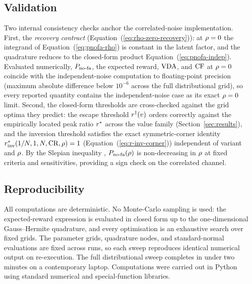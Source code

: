 \subsection{Validation}
\label{sec:methods-validation}

Two internal consistency checks anchor the correlated-noise
implementation. First, the \emph{recovery contract}
(Equation~(\ref{eq:rho-zero-recovery})): at $\rho = 0$ the integrand of
Equation~(\ref{eq:pnofa-rho}) is constant in the latent factor, and the
quadrature reduces to the closed-form product
Equation~(\ref{eq:pnofa-indep}). Evaluated numerically, $P_{\mathrm{no\text{-}fa}}$, the
expected reward, $\mathrm{VDA}$, and $\mathrm{CF}$ at $\rho = 0$ coincide with the
independent-noise computation to floating-point precision (maximum
absolute difference below $10^{-6}$ across the full distributional
grid), so every reported quantity contains the independent-noise case as
its exact $\rho = 0$ limit. Second, the closed-form thresholds are
cross-checked against the grid optima they predict: the escape threshold
$r^{\dagger}(v)$ orders correctly against the empirically located peak
ratio $r^{*}$ across the value family (Section~\ref{sec:results}),
and the inversion threshold satisfies the exact symmetric-corner
identity $r^{*}_{\mathrm{inv}}(1/N, 1, N, \mathrm{CR}, \rho) = 1$
(Equation~(\ref{eq:r-inv-corner})) independent of variant and $\rho$.
By the Slepian inequality \cite{Slepian1962}, $P_{\mathrm{no\text{-}fa}}(\rho)$ is
non-decreasing in $\rho$ at fixed criteria and sensitivities, providing
a sign check on the correlated channel.

\subsection{Reproducibility}
\label{sec:methods-reproducibility}

All computations are deterministic. No Monte-Carlo sampling is used: the
expected-reward expression is evaluated in closed form up to the
one-dimensional Gauss--Hermite quadrature, and every optimisation is an
exhaustive search over fixed grids. The parameter grids, quadrature
nodes, and standard-normal evaluations are fixed across runs, so each
sweep reproduces identical numerical output on re-execution. The full
distributional sweep completes in under two minutes on a contemporary
laptop. Computations were carried out in Python using standard numerical
and special-function libraries.
